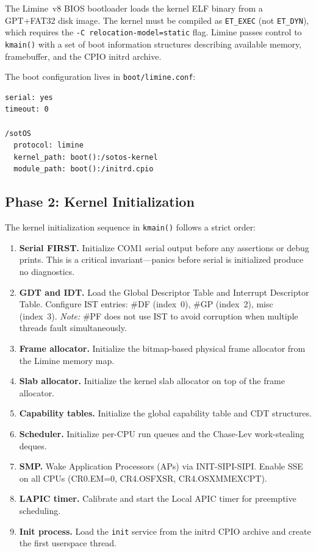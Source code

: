 \documentclass[11pt,a4paper,twoside]{report}
\theoremstyle{definition}
\newcommand{\file}[1]{\texttt{#1}}
\begin{document}
The Limine~v8 BIOS bootloader loads the kernel ELF binary from a GPT+FAT32
disk image. The kernel must be compiled as \texttt{ET\_EXEC} (not
\texttt{ET\_DYN}), which requires the \texttt{-C relocation-model=static}
flag. Limine passes control to \texttt{kmain()} with a set of boot
information structures describing available memory, framebuffer, and the
CPIO initrd archive.

The boot configuration lives in \file{boot/limine.conf}:
\begin{lstlisting}[language={},caption={Limine boot configuration (excerpt).}]
serial: yes
timeout: 0

/sotOS
  protocol: limine
  kernel_path: boot():/sotos-kernel
  module_path: boot():/initrd.cpio
\end{lstlisting}

\subsection{Phase 2: Kernel Initialization}

The kernel initialization sequence in \texttt{kmain()} follows a strict order:

\begin{enumerate}[leftmargin=1.4em]
  \item \textbf{Serial FIRST.} Initialize COM1 serial output before any
    assertions or debug prints. This is a critical invariant---panics
    before serial is initialized produce no diagnostics.
  \item \textbf{GDT and IDT.} Load the Global Descriptor Table and
    Interrupt Descriptor Table. Configure IST entries: \#DF (index~0),
    \#GP (index~2), misc (index~3). \textit{Note:} \#PF does not use IST
    to avoid corruption when multiple threads fault simultaneously.
  \item \textbf{Frame allocator.} Initialize the bitmap-based physical
    frame allocator from the Limine memory map.
  \item \textbf{Slab allocator.} Initialize the kernel slab allocator on
    top of the frame allocator.
  \item \textbf{Capability tables.} Initialize the global capability table
    and CDT structures.
  \item \textbf{Scheduler.} Initialize per-CPU run queues and the
    Chase-Lev work-stealing deques.
  \item \textbf{SMP.} Wake Application Processors (APs) via INIT-SIPI-SIPI.
    Enable SSE on all CPUs (CR0.EM=0, CR4.OSFXSR, CR4.OSXMMEXCPT).
  \item \textbf{LAPIC timer.} Calibrate and start the Local APIC timer for
    preemptive scheduling.
  \item \textbf{Init process.} Load the \texttt{init} service from the
    initrd CPIO archive and create the first userspace thread.
\end{enumerate}
\end{document}

